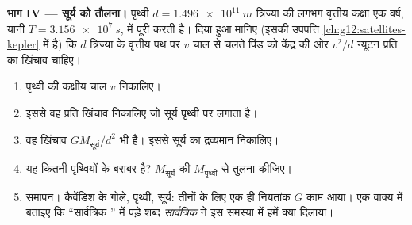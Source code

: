 \begin{problem}[{सप्ताहांत समस्या --- एक छप्पर में रखे सीसे के दो गोलों
से पृथ्वी के, और फिर सूर्य के द्रव्यमान तक: एक छोटा-सा नियतांक, एक बार
नाप लेने पर, किस काम आता है}]
\medskip
\noindent\textbf{भाग IV --- सूर्य को तौलना।}
पृथ्वी $d = \qty{1.496e11}{m}$ त्रिज्या की लगभग वृत्तीय कक्षा एक वर्ष, यानी
$T = \qty{3.156e7}{s}$, में पूरी करती है। दिया हुआ मानिए (इसकी उपपत्ति \cref{ch:g12:satellites-kepler} में है)
कि $d$ त्रिज्या के वृत्तीय पथ पर $v$ चाल से चलते पिंड को केंद्र
की ओर $v^2/d$ न्यूटन प्रति  का खिंचाव चाहिए।
\begin{enumerate}[resume]
  \item पृथ्वी की कक्षीय चाल $v$ निकालिए।
  \item इससे वह प्रति  खिंचाव निकालिए जो सूर्य पृथ्वी
        पर लगाता है।
  \item वह खिंचाव $G M_{\text{सूर्य}} / d^2$ भी है। इससे सूर्य का द्रव्यमान निकालिए।
  \item यह कितनी पृथ्वियों के बराबर है? $M_{\text{सूर्य}}$ की $M_{\text{पृथ्वी}}$ से तुलना
        कीजिए।
  \item समापन। कैवेंडिश के गोले, पृथ्वी, सूर्य: तीनों के लिए एक ही
        नियतांक $G$ काम आया। एक वाक्य में बताइए कि ``सार्वत्रिक
        '' में पड़े शब्द \emph{सार्वत्रिक} ने इस
        समस्या में हमें क्या दिलाया।
\end{enumerate}
\end{problem}
